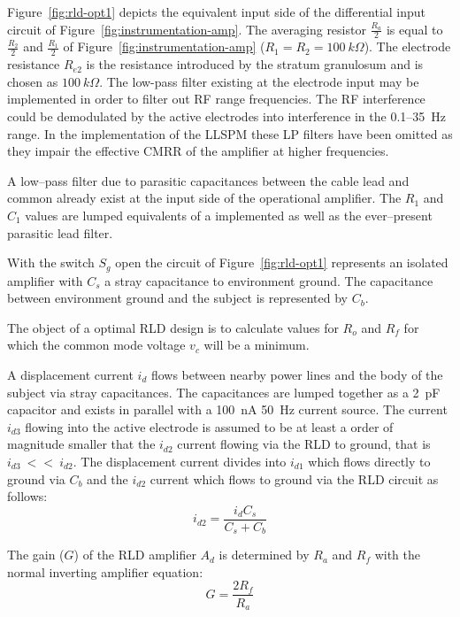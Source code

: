 Figure~\vref{fig:rld-opt1} depicts the equivalent input side of the
differential input circuit of
Figure~\ref{fig:instrumentation-amp}. The averaging resistor
$\frac{R_a}{2}$ is equal to $\frac{R_2}{2}$ and $\frac{R_1}{2}$ of
Figure~\ref{fig:instrumentation-amp} ($R_1 = R_2 = 100~k\Omega$). The
electrode resistance $R_{e2}$ is the resistance introduced by the
stratum granulosum and is chosen as $100~k\Omega$. The low-pass filter
existing at the electrode input may be implemented in order to filter
out RF range frequencies. The RF interference could be demodulated by
the active electrodes into interference in the 0.1--35~Hz range. In
the implementation of the LLSPM these LP filters have been omitted as
they impair the effective CMRR of the amplifier at higher frequencies.

A low--pass filter due to parasitic capacitances between the cable
lead and common already exist at the input side of the operational
amplifier. The $R_1$ and $C_1$ values are lumped equivalents of a
implemented as well as the ever--present parasitic lead filter.

With the switch $S_g$ open the circuit of Figure~\ref{fig:rld-opt1}
represents an isolated amplifier with $C_s$ a stray capacitance to
environment ground. The capacitance between environment ground and the
subject is represented by $C_b$.

The object of a optimal RLD design is to calculate values for $R_o$
and $R_f$ for which the common mode voltage $v_c$ will be a minimum.


A displacement current $i_d$ flows between nearby power lines and the
body of the subject via stray capacitances. The capacitances are
lumped together as a 2~pF capacitor and exists in parallel with a
100~nA 50~Hz current source. The current $i_{d3}$ flowing into the
active electrode is assumed to be at least a order of magnitude
smaller that the $i_{d2}$ current flowing via the RLD to ground, that
is $i_{d3}~<<~i_{d2}$. The displacement current divides into $i_{d1}$
which flows directly to ground via $C_b$ and the $i_{d2}$ current
which flows to ground via the RLD circuit as follows:
\begin{equation}
	i_{d2} = \frac{i_dC_s}{C_s + C_b}
	\label{eq:id2}
\end{equation}

The gain ($G$) of the RLD amplifier $A_d$ is determined by $R_a$ and
$R_f$ with the normal inverting amplifier equation:
\begin{equation}
	G = \frac{2R_f}{R_a}
	\label{eq:G}
\end{equation}


